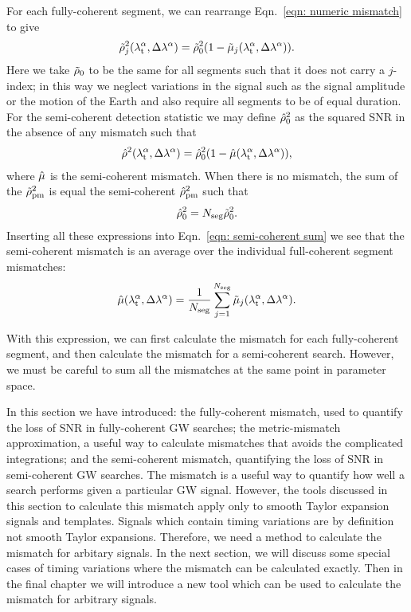 \documentclass[../full_thesis/full_thesis.tex]{subfiles}
\begin{document}
For each fully-coherent segment, we can rearrange Eqn.~\eqref{eqn: numeric mismatch}
to give
\begin{align}
\tilde{\rho}^{2}_{j}({\lambda}_\textrm{t}^{\alpha}, \Delta\lambda^{\alpha}) =
 \tilde{\rho}^{2}_{0}(1 - \tilde{\mu}_{j}({\lambda}_\textrm{t}^{\alpha}, \Delta\lambda^{\alpha})).
\end{align}
Here we take $\tilde{\rho}_{0}$ to be the same for all segments such that
it does not carry a $j$-index; in this way we neglect variations
in the signal such as the signal amplitude or the motion of the Earth and also require
all segments to be of equal duration.
For the semi-coherent
detection statistic we may define $\hat{\rho}^{2}_0$ as the squared SNR in the
absence of any mismatch such that
\begin{align}
\hat{\rho}^{2}({\lambda}_\textrm{t}^{\alpha}, \Delta\lambda^{\alpha}) =
 \hat{\rho}^{2}_0(1 - \hat{\mu}({\lambda}_\textrm{t}^{\alpha}, \Delta\lambda^{\alpha})),
\end{align}
where $\hat{\mu}$ is the semi-coherent mismatch.
When there is no mismatch, the sum of the $\tilde{\rho}^{2}_{\mathrm{pm}}$ is equal the
semi-coherent $\hat{\rho}^{2}_{\mathrm{pm}}$ such that
\begin{align}
\hat{\rho}^{2}_0 = N_{\textrm{seg}}\tilde{\rho}^{2}_0.
\end{align}
Inserting all these expressions into Eqn.~\eqref{eqn: semi-coherent sum} we see that
the semi-coherent mismatch is an average over the individual full-coherent segment
mismatches:
\begin{align}
\hat{\mu}({\lambda}_\textrm{t}^{\alpha}, \Delta\lambda^{\alpha}) =
 \frac{1}{N_{\textrm{seg}}}\sum_{j=1}^{N_{\textrm{seg}}}\tilde{\mu}_{j}({\lambda}_\textrm{t}^{\alpha}, \Delta\lambda^{\alpha}).
\label{eqn: semi-coherent mismatch}
\end{align}

With this expression, we can first calculate the mismatch for each fully-coherent
segment, and then calculate the mismatch for a semi-coherent search. However, we
must be careful to sum all the mismatches at the same point in parameter space.

In this section we have introduced: the fully-coherent mismatch, used to
quantify the loss of SNR in fully-coherent GW searches; the metric-mismatch
approximation, a useful way to calculate mismatches that avoids the complicated
integrations; and the semi-coherent mismatch, quantifying the loss of SNR in
semi-coherent GW searches. The mismatch is a useful way to quantify how well a
search performs given a particular GW signal. However, the tools discussed in
this section to calculate this mismatch apply only to smooth Taylor expansion
signals and templates. Signals which contain timing variations are by definition
not smooth Taylor expansions. Therefore, we need a method to calculate the
mismatch for arbitary signals. In the next section, we will discuss some
special cases of timing variations where the mismatch can be calculated
exactly. Then in the final chapter we will introduce a new tool which can be
used to calculate the mismatch for arbitrary signals.
\end{document}
